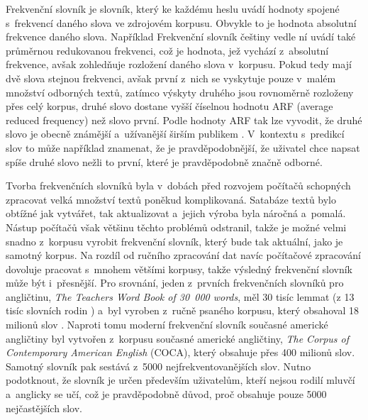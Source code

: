 \documentclass[a4paper,11pt,openany]{book} %
\begin{document}
Frekvenční slovník je slovník, který ke každému heslu uvádí hodnoty spojené s~frekvencí daného slova ve zdrojovém korpusu. Obvykle to je hodnota absolutní frekvence daného slova. Například Frekvenční slovník češtiny %
vedle ní uvádí také průměrnou redukovanou frekvenci, což je hodnota, jež vychází z~absolutní frekvence, avšak zohledňuje rozložení daného slova v~korpusu. Pokud tedy mají dvě slova stejnou frekvenci, avšak první z~nich se vyskytuje pouze v~malém množství odborných textů, zatímco výskyty druhého jsou rovnoměrně rozloženy přes celý korpus, druhé slovo dostane vyšší číselnou hodnotu ARF (average reduced frequency) než slovo první. Podle hodnoty ARF tak lze vyvodit, že druhé slovo je obecně známější a~užívanější širším publikem \parencite{vcermak2004frekvenvcni}. %
V~kontextu s~predikcí slov to může například znamenat, že je pravděpodobnější, že uživatel chce napsat spíše druhé slovo nežli to první, které je pravděpodobně značně odborné.


Tvorba frekvenčních slovníků byla v~dobách před rozvojem počítačů schopných zpracovat velká množství textů poněkud komplikovaná. Satabáze textů bylo obtížné jak vytvářet, tak aktualizovat a~jejich výroba byla náročná a~pomalá. Nástup počítačů však většinu těchto problémů odstranil, takže je možné velmi snadno z~korpusu vyrobit frekvenční slovník, který bude tak aktuální, jako je samotný korpus. Na rozdíl od ručního zpracování dat navíc počítačové zpracování dovoluje pracovat s~mnohem většími korpusy, takže výsledný frekvenční slovník může být i~přesnější. Pro srovnání, jeden z~prvních frekvenčních slovníků pro angličtinu, {\it The Teachers Word Book of 30~000 words}, měl 30 tisíc lemmat (z 13 tisíc slovních rodin \parencite{lorge1944teacher}%
) a~byl vyroben z~ručně psaného korpusu, který obsahoval 18 milionů slov \parencite{nation1997vocabulary}. %
Naproti tomu moderní frekvenční slovník současné americké angličtiny \parencite{davies2013frequency} byl vytvořen z~korpusu současné americké angličtiny, {\it The Corpus of Contemporary American English} (COCA), který obsahuje přes 400 milionů slov. Samotný slovník pak sestává z~5000 nejfrekventovanějších slov. Nutno podotknout, že slovník je určen především uživatelům, kteří nejsou rodilí mluvčí a~anglicky se učí, což je pravděpodobně důvod, proč obsahuje pouze 5000 nejčastějších slov.
\end{document}
